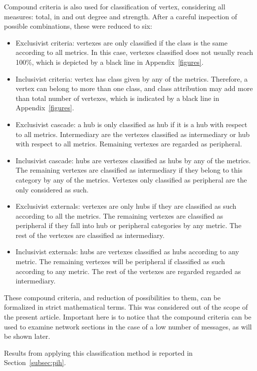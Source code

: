\documentclass[%
 aip,
 jmp,%
 amsmath,amssymb,
 reprint,%
]{revtex4-1}
\begin{document}
Compound criteria is also used for classification of vertex, considering all measures: total, in and out degree and strength. After a careful inspection of possible combinations, these were reduced to six:

\begin{itemize}
    \item Exclusivist criteria: vertexes are only classified if the class is the same according to all metrics. In this case, vertexes classified does not usually reach 100\%, which is depicted by a black line in Appendix~\ref{figures}.
    \item Inclusivist criteria: vertex has class given by any of the metrics. Therefore, a vertex can belong to more than one class, and class attribution may add more than total number of vertexes, which is indicated by a black line in Appendix~\ref{figures}.
    \item Exclusivist cascade: a hub is only classified as hub if it is a hub with respect to all metrics. Intermediary are the vertexes classified as intermediary or hub with respect to all metrics. Remaining vertexes are regarded as peripheral.
    \item Inclusivist cascade: hubs are vertexes classified as hubs by any of the metrics. The remaining vertexes are classified as intermediary if they belong to this category by any of the metrics. Vertexes only classified as peripheral are the only considered as such.
    \item Exclusivist externals: vertexes are only hubs if they are classified as such according to all the metrics. The remaining vertexes are classified as peripheral if they fall into hub or peripheral categories by any metric. The rest of the vertexes are classified as intermediary.
    \item Inclusivist externals: hubs are vertexes classified as hubs according to any metric. The remaining vertexes will be peripheral if classified as such according to any metric. The rest of the vertexes are regarded regarded as intermediary.
\end{itemize}

These compound criteria, and reduction of possibilities to them, can be formalized in strict mathematical terms. This was considered out of the scope of the present article. Important here is to notice that the compound criteria can be used to examine network sections in the case of a low number of messages, as will be shown later.

Results from applying this classification method is reported in Section~\ref{subsec:pih}.
\end{document}
